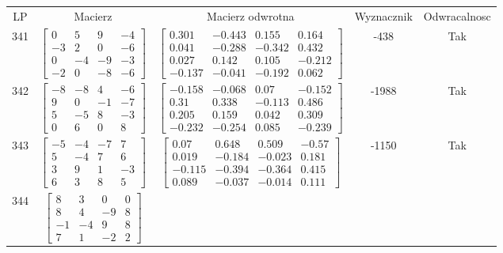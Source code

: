 \documentclass[a4paper,12pt]{article}
\begin{document}
\bgroup {} \vspace{0.2in} \begin{tabular}{c c c c c}
LP & Macierz & Macierz odwrotna & Wyznacznik & Odwracalnosc\\
341
&
$\begin{bmatrix} 0 & 5 & 9 & -4 \\ -3 & 2 & 0 & -6 \\ 0 & -4 & -9 & -3 \\ -2 & 0 & -8 & -6 \end{bmatrix}$
&
$\begin{bmatrix} 0.301 & -0.443 & 0.155 & 0.164 \\ 0.041 & -0.288 & -0.342 & 0.432 \\ 0.027 & 0.142 & 0.105 & -0.212 \\ -0.137 & -0.041 & -0.192 & 0.062 \end{bmatrix}$
&
-438
&
Tak
\\
342
&
$\begin{bmatrix} -8 & -8 & 4 & -6 \\ 9 & 0 & -1 & -7 \\ 5 & -5 & 8 & -3 \\ 0 & 6 & 0 & 8 \end{bmatrix}$
&
$\begin{bmatrix} -0.158 & -0.068 & 0.07 & -0.152 \\ 0.31 & 0.338 & -0.113 & 0.486 \\ 0.205 & 0.159 & 0.042 & 0.309 \\ -0.232 & -0.254 & 0.085 & -0.239 \end{bmatrix}$
&
-1988
&
Tak
\\
343
&
$\begin{bmatrix} -5 & -4 & -7 & 7 \\ 5 & -4 & 7 & 6 \\ 3 & 9 & 1 & -3 \\ 6 & 3 & 8 & 5 \end{bmatrix}$
&
$\begin{bmatrix} 0.07 & 0.648 & 0.509 & -0.57 \\ 0.019 & -0.184 & -0.023 & 0.181 \\ -0.115 & -0.394 & -0.364 & 0.415 \\ 0.089 & -0.037 & -0.014 & 0.111 \end{bmatrix}$
&
-1150
&
Tak
\\
344
&
$\begin{bmatrix} 8 & 3 & 0 & 0 \\ 8 & 4 & -9 & 8 \\ -1 & -4 & 9 & 8 \\ 7 & 1 & -2 & 2 \end{bmatrix}$

\end{tabular}
\end{document}
